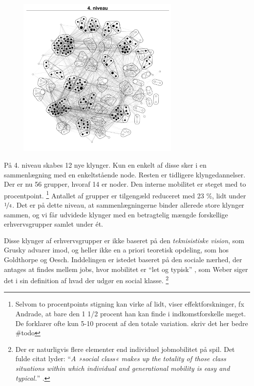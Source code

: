 \begin{figure}
  \vspace{-20pt}
  \begin{center}
   \caption{}
   \label{fig_delanalyse1_kort_seg_proces4}
    \includegraphics[width=8cm]{fig/netvaerkskort/kort_seg_proces4.pdf}
  \end{center}
  \label{fig_delanalyse1_kort_seg_proces4}
  \vspace{-20pt}
\end{figure}

På 4. niveau skabes 12 nye klynger. Kun en enkelt af disse sker i en sammenlægning med en enkeltstående node. Resten er tidligere klyngedannelser. 
Der er nu 56 grupper, hvoraf 14 er noder. Den interne mobilitet er steget med to procentpoint.
%
\footnote{Selvom to procentpoints stigning kan virke af lidt, viser effektforskninger, fx Andrade, at bare den 1 1/2 procent han kan finde i indkomstforskelle meget. De forklarer ofte kun 5-10 procent af den totale variation. skriv det her bedre \#todo}%
%
Antallet af grupper er tilgengæld reduceret med 23 \%, lidt under $\nicefrac{1}{4}$. Det er på dette niveau, at sammenlægningerne binder allerede store klynger sammen, og vi får udvidede klynger med en betragtelig mængde forskellige erhvervsgrupper samlet under ét.

Disse klynger af erhvervsgrupper er ikke baseret på den \emph{teknisistiske vision}, som Grusky advarer imod, og heller ikke en a priori teoretisk opdeling, som hos Goldthorpe og Oesch. Inddelingen er istedet baseret på den sociale nærhed, der antages at findes mellem jobs, hvor mobilitet er “let og typisk” , som Weber siger det i sin definition af hvad der udgør en social klasse. %
%
\footnote{Der er naturligvis flere elementer end individuel jobmobilitet på spil. Det fulde citat lyder: “\textit{A »social class« makes up the totality of those class situations within which individual and generational mobility is easy and typical.}” \parencite[302]{Weber1978}. }%
%

